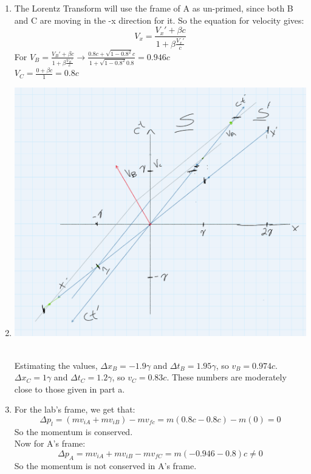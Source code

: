 \documentclass[11pt]{article}
\begin{document}
\begin{enumerate}[label=\alph*)]
    \item The Lorentz Transform will use the frame of A as un-primed, since both B and C are moving in the -x direction for it. So the equation for velocity gives:
        \[V_x = \frac{V_x' + \beta c}{1 + \beta \frac{V_x'}{c}}\]
        For $V_B = \frac{V_B'+\beta c}{1+\beta\frac{V_B'}{c}} \rightarrow  \frac{0.8c+\sqrt{1-0.8^2}c}{1+\sqrt{1-0.8^2}0.8} = 0.946c$\\
        $V_C = \frac{0+\beta c}{1} = 0.8c$
    \item
        \parbox{0}{ \includegraphics[width = 400pt]{Homework07/Homework7.PNG}}\\
        Estimating the values, $\Delta x_B = -1.9 \gamma$ and $\Delta t_B = 1.95 \gamma$, so $v_B = 0.974c$. $\Delta x_C = 1 \gamma$ and $\Delta t_C = 1.2 \gamma$, so $v_C = 0.83c$. These numbers are moderately close to those given in part a. 
    \item
        For the lab's frame, we get that:
        \[\Delta p_l = (mv_{iA} + mv_{iB})-mv_{fc} = m(0.8c-0.8c) - m(0) = 0\]
        So the momentum is conserved. \\
        Now for A's frame:
        \[\Delta p_A = mv_{iA}+ mv_{iB} - mv_{fC}= m(-0.946-0.8)c \neq 0\]
        So the momentum is not conserved in A's frame.

\end{enumerate}
\end{document}
